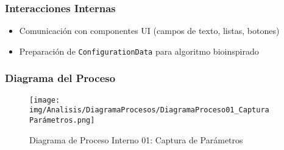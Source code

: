 \subsubsection{Interacciones Internas}
\begin{itemize}
    \item Comunicación con componentes UI (campos de texto, listas, botones)
    \item Preparación de \texttt{ConfigurationData} para algoritmo bioinspirado
\end{itemize}

\subsubsection{Diagrama del Proceso}
\begin{figure}[H]
    \centering
    \texttt{[image: img/Analisis/DiagramaProcesos/DiagramaProceso01\_Captura Parámetros.png]}
    \caption{Diagrama de Proceso Interno 01: Captura de Parámetros}%
    \label{fig:process_diagram01}
\end{figure}
